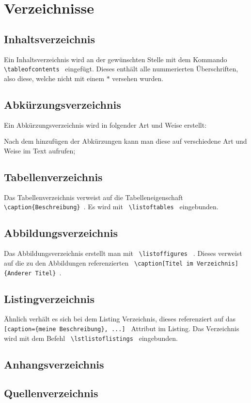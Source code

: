 \section{Verzeichnisse}
\subsection{Inhaltsverzeichnis}
Ein Inhaltsverzeichnis wird an der gewünschten Stelle mit dem Kommando 
\lstinline$ \tableofcontents $ eingefügt. Dieses enthält alle nummerierten 
Überschriften, also diese, welche nicht mit einem $*$ versehen wurden.
\subsection{Abkürzungsverzeichnis}
Ein Abkürzungsverzeichnis wird in folgender Art und Weise erstellt:


Nach dem hinzufügen der Abkürzungen kann man diese auf verschiedene Art und 
Weise im Text aufrufen;


\subsection{Tabellenverzeichnis}
Das Tabellenverzeichnis verweist auf die Tabelleneigenschaft 
\lstinline$ \caption{Beschreibung} $. Es wird mit 
\lstinline $ \listoftables $ eingebunden.

\subsection{Abbildungsverzeichnis}
Das Abbildungsverzeichnis erstellt man mit \lstinline$ \listoffigures $ . 
Dieses verweist auf die zu den Abbildungen referenzierten 
\lstinline $ \caption[Titel im Verzeichnis]{Anderer Titel} $.
\subsection{Listingverzeichnis}
Ähnlich verhält es sich bei dem Listing Verzeichnis, dieses referenziert auf 
das \lstinline $ [caption={meine Beschreibung}, ...] $ Attribut im Listing.
Das Verzeichnis wird mit dem Befehl \lstinline $ \lstlistoflistings $ 
eingebunden.
\subsection{Anhangsverzeichnis}
\subsection{Quellenverzeichnis}